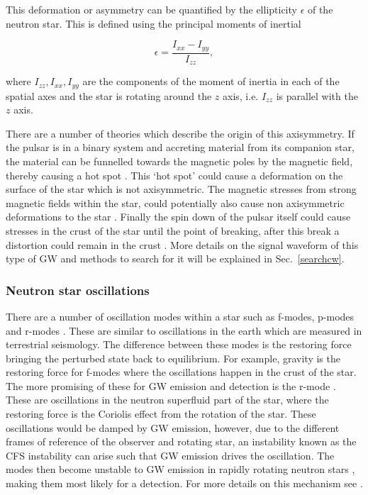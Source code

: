 This deformation or asymmetry can be quantified by the ellipticity $\epsilon$ of the neutron star.
This is defined using the principal moments of inertial

\begin{equation}
\label{intro:source:cw:ellipticity}
\epsilon = \frac{I_{xx}-I_{yy}}{I_{zz}},
\end{equation}

where $I_{zz},I_{xx},I_{yy}$ are the components of the moment of inertia in each of the spatial axes and the star is rotating around the $z$ axis, i.e. $I_{zz}$ is parallel with the $z$ axis.

There are a number of theories which describe the origin of this axisymmetry.
If the pulsar is in a binary system and accreting material from its companion
star, the material can be funnelled towards the magnetic poles by the magnetic
field, thereby causing a hot spot \citep{haskell2015DetectingGravitational}.
This `hot spot' could cause a deformation on the surface of the star which is
not axisymmetric.  The magnetic stresses from strong magnetic fields within the
star, could potentially also cause non axisymmetric deformations to the star
\citep{cutler2002GravitationalWaves}. Finally
the spin down of the pulsar itself could cause stresses in the crust of the
star until the point of breaking, after this break a
distortion could remain in the crust \citep{becker2009NeutronStars} .  
More details on the signal waveform of this type of \gls{GW} and methods to search for it will be explained in Sec.~\ref{searchcw}.
 
\subsubsection{Neutron star oscillations}
There are a number of oscillation modes within a star such as f-modes, p-modes
and r-modes \citep{becker2009NeutronStars}.  These are similar to oscillations
in the earth which are measured in terrestrial seismology.  The difference
between these modes is the restoring force bringing the perturbed state back to
equilibrium.  For example, gravity is the restoring force for f-modes where the
oscillations happen in the crust of the star.  The more promising of these for
\gls{GW} emission and detection is the r-mode
\citep{owen2000GravitationalWaves}.
These are oscillations in the neutron superfluid part of the star, where the
restoring force is the Coriolis effect from the rotation of the star.  
These oscillations would be damped by \gls{GW} emission, however, due to the different frames of reference of the observer and rotating star, an instability known as the \gls{CFS} instability \citep{chandrasekhar1970SolutionsTwo} can arise such that \gls{GW} emission drives the oscillation. 
The modes then become unstable to \gls{GW} emission in rapidly rotating neutron
stars \citep{owen2000GravitationalWaves}, making them most likely for a
detection.  For more details on this mechanism see
\citep{owen2000GravitationalWaves,lasky2015GravitationalWaves,owen1998GravitationalWaves,jonesCFSInstability}.

